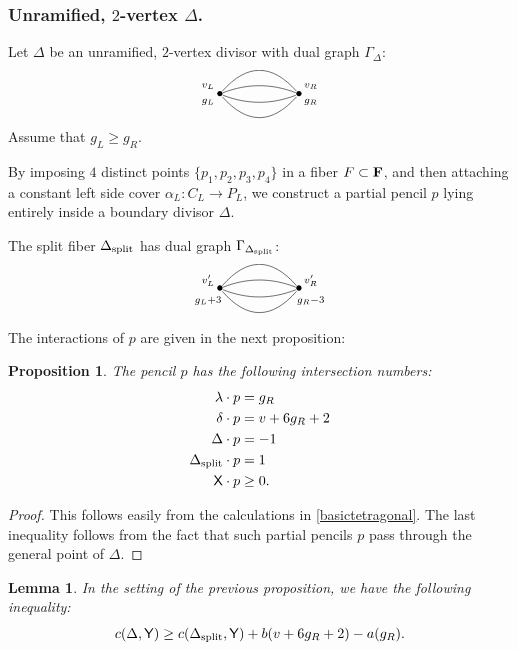 \documentclass[reqno, 10 pt]{article}
\newtheorem{lem}[thm]{Lemma}
\newtheorem{prop}[thm]{Proposition}
\theoremstyle{definition}
\theoremstyle{remark}
\numberwithin{equation}{section}
\numberwithin{thm}{section}
\numberwithin{prop}{section}
\numberwithin{lem}{section}
\numberwithin{cor}{section}
\numberwithin{conj}{section}
\numberwithin{defn}{section}
\newcommand{\F}{{\mathbf F}}
\renewcommand{\to}{\longrightarrow}
\newcommand{\sfY}{{\mathsf Y}}
\newcommand{\sfX}{{\mathsf X}}
\renewcommand{\F}{{\bf F}}
\newcommand {\from}{{\colon}}
\newcommand {\spl}{{\rm split}}
\begin{document}
\subsubsection{Unramified, $2$-vertex $\Delta$.}
Let $\Delta$ be an unramified, $2$-vertex divisor with dual graph $\Gamma_\Delta$:\[  \xygraph{
!{<0cm,0cm>;<1cm,0cm>:<0cm,1cm>::}
!{(0,0) }*{\bullet}="l"!{(-.3,.2)}{\scriptstyle v_L}!{(-.3,-.2)}{\scriptstyle g_L}
!{(2,0) }*{\bullet}="r"!{(2.3,.2)}{\scriptstyle v_R}!{(2.3,-.2)}{\scriptstyle g_R}
 "l"-@/^.6cm/"r"  
"l"-@/^/"r" 
"l"-@/_/"r"
"l"-@/_.6cm/"r" 
}  \]Assume that $g_L \geq g_R$.




By imposing $4$ distinct points $\{p_{1}, p_{2}, p_{3}, p_{4}\}$ in a fiber $F \subset \F$, and then attaching a constant left side cover $\alpha_{L} \from C_{L} \to P_{L}$, we construct a partial pencil $p$ lying entirely inside a boundary divisor $\Delta$. 

The split fiber $\Delta_{\spl}$ has dual graph $\Gamma_{\Delta_{\spl}}$: \[  \xygraph{
!{<0cm,0cm>;<1cm,0cm>:<0cm,1cm>::}
!{(0,0) }*{\bullet}="l"!{(-.3,.2)}{\scriptstyle v'_L}!{(-.3,-.3)}{\scriptstyle g_L+3}
!{(2,0) }*{\bullet}="r"!{(2.3,.2)}{\scriptstyle v'_R}!{(2.3,-.3)}{\scriptstyle g_R-3}
 "l"-@/^.6cm/"r"  
"l"-@/^/"r" 
"l"-@/_/"r"
"l"-@/_.6cm/"r" 
}  \] 




The interactions of $p$ are given in the next proposition:

\begin{prop}
The pencil $p$ has the following intersection numbers:
\begin{align*}
\lambda \cdot p &= g_{R}\\
\delta \cdot p &= v + 6g_{R} + 2\\
\Delta \cdot p &= -1\\
\Delta_{\spl} \cdot p &= 1\\
\sfX \cdot p &\geq 0.
\end{align*}
\end{prop} 

\begin{proof}
This follows easily from the calculations in \autoref{basictetragonal}. The last inequality follows from the fact that such partial pencils $p$ pass through the general point of $\Delta$.
\end{proof}

\begin{lem}\label{induct-tetra-1}
In the setting of the previous proposition, we have the following inequality:
$$c(\Delta, \sfY) \geq c(\Delta_{\spl}, {\sfY}) + b(v+6g_R +2) - a(g_R).$$
\end{lem}
\end{document}
